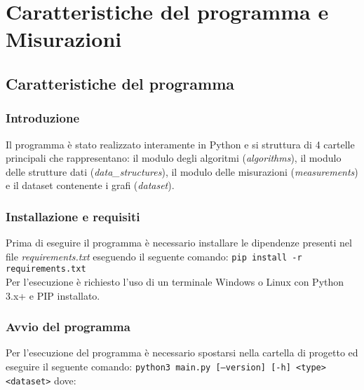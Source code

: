 \section{Caratteristiche del programma e Misurazioni}

\subsection{Caratteristiche del programma}

\subsubsection{Introduzione}

Il programma è stato realizzato interamente in Python e si struttura di 4 cartelle principali che rappresentano: il modulo degli algoritmi (\textit{algorithms}), il modulo delle strutture dati (\textit{data\_structures}), il modulo delle misurazioni (\textit{measurements}) e il dataset contenente i grafi (\textit{dataset}). 

\subsubsection{Installazione e requisiti}

Prima di eseguire il programma è necessario installare le dipendenze presenti nel file \textit{requirements.txt} eseguendo il seguente comando: \texttt{pip install -r requirements.txt}
\\Per l'esecuzione è richiesto l'uso di un terminale Windows o Linux con Python 3.x+ e PIP installato.

\subsubsection{Avvio del programma}

Per l'esecuzione del programma è necessario spostarsi nella cartella di progetto ed eseguire il seguente comando: 
\texttt{python3 main.py [--version] [-h] <type> <dataset>} dove:

